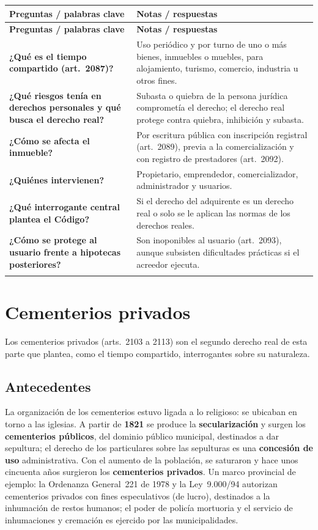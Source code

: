 \documentclass[12pt,oneside]{book}
\makeatletter
\renewcommand{\arraystretch}{1.25}
\newcommand{\cq}[2]{\textbf{#1} & #2 \\[0.45em]}
\newcommand{\cornell}[3]{%
\par\bigskip\noindent{\large\bfseries Cuadro Cornell: #1}\par\nopagebreak\smallskip
\begingroup
\small
\renewcommand{\arraystretch}{1.15}
\begin{longtable}{@{}>{\raggedright\arraybackslash}p{0.26\textwidth}>{\raggedright\arraybackslash}p{0.66\textwidth}@{}}
\toprule
\textbf{Preguntas / palabras clave} & \textbf{Notas / respuestas} \\
\midrule
\endfirsthead
\toprule
\textbf{Preguntas / palabras clave} & \textbf{Notas / respuestas} \\
\midrule
\endhead
#2
\midrule
\multicolumn{2}{@{}p{\dimexpr0.92\textwidth+2\tabcolsep\relax}@{}}{\vspace{0.2em}\textbf{Resumen.} #3\vspace{0.2em}} \\
\bottomrule
\end{longtable}
\endgroup
}
\makeatother
\begin{document}
\cornell{tiempo compartido}{
\cq{¿Qué es el tiempo compartido (art.~2087)?}{Uso periódico y por turno de uno o más bienes, inmuebles o muebles, para alojamiento, turismo, comercio, industria u otros fines.}
\cq{¿Qué riesgos tenía en derechos personales y qué busca el derecho real?}{Subasta o quiebra de la persona jurídica comprometía el derecho; el derecho real protege contra quiebra, inhibición y subasta.}
\cq{¿Cómo se afecta el inmueble?}{Por escritura pública con inscripción registral (art.~2089), previa a la comercialización y con registro de prestadores (art.~2092).}
\cq{¿Quiénes intervienen?}{Propietario, emprendedor, comercializador, administrador y usuarios.}
\cq{¿Qué interrogante central plantea el Código?}{Si el derecho del adquirente es un derecho real o solo se le aplican las normas de los derechos reales.}
\cq{¿Cómo se protege al usuario frente a hipotecas posteriores?}{Son inoponibles al usuario (art.~2093), aunque subsisten dificultades prácticas si el acreedor ejecuta.}
}{El tiempo compartido es un uso periódico y por turno de bienes afectados mediante escritura inscripta, protegido frente a acreedores posteriores y sometido a normas de consumo. Su naturaleza real sigue siendo discutida y falta la ley especial de registro.}

\chapter[Cementerios privados]{Cementerios privados}\label{cap:cp}

Los cementerios privados (arts.~2103 a 2113) son el segundo derecho real de esta parte que plantea, como el tiempo compartido, interrogantes sobre su naturaleza.

\section{Antecedentes}

La organización de los cementerios estuvo ligada a lo religioso: se ubicaban en torno a las iglesias. A partir de \textbf{1821} se produce la \textbf{secularización} y surgen los \textbf{cementerios públicos}, del dominio público municipal, destinados a dar sepultura; el derecho de los particulares sobre las sepulturas es una \textbf{concesión de uso} administrativa. Con el aumento de la población, se saturaron y hace unos cincuenta años surgieron los \textbf{cementerios privados}. Un marco provincial de ejemplo: la Ordenanza General~221 de 1978 y la Ley~9.000/94 autorizan cementerios privados con fines especulativos (de lucro), destinados a la inhumación de restos humanos; el poder de policía mortuoria y el servicio de inhumaciones y cremación es ejercido por las municipalidades.
\end{document}
